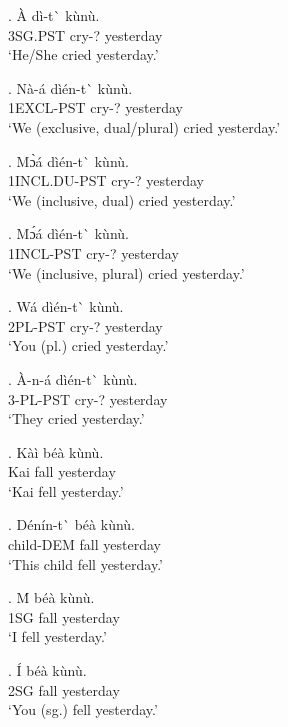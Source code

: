 \documentclass{assets/fieldnotes}
\begin{document}
{\exg. \`{A} d\`{i}-t\`{} k\`{u}n\`{u}. \\
3SG.PST cry-? yesterday \\
`He/She cried yesterday.'

\exg. N\`{a}-\'{a} d\`{i}\'{e}n-t\`{} k\`{u}n\`{u}. \\
1EXCL-PST cry-? yesterday \\
`We (exclusive, dual/plural) cried yesterday.'

\exg. M\`{ɔ}\'{a} d\`{i}\'{e}n-t\`{} k\`{u}n\`{u}. \\
1INCL.DU-PST cry-? yesterday \\
`We (inclusive, dual) cried yesterday.'

\exg. M\'{ɔ}\'{a} d\`{i}\'{e}n-t\`{} k\`{u}n\`{u}. \\
1INCL-PST cry-? yesterday \\
`We (inclusive, plural) cried yesterday.'

\exg. W\'{a} d\`{i}\'{e}n-t\`{} k\`{u}n\`{u}. \\
2PL-PST cry-? yesterday \\
`You (pl.) cried yesterday.' 

\exg. \`{A}-n-\'{a} d\`{i}\'{e}n-t\`{} k\`{u}n\`{u}. \\
3-PL-PST cry-? yesterday \\
`They cried yesterday.'


\exg. K\`{a}\`{i} b\'{e}\`{a} k\`{u}n\`{u}. \\
Kai fall yesterday \\
`Kai fell yesterday.'

\exg. D\'{e}n\'{i}n-t\`{} b\'{e}\`{a} k\`{u}n\`{u}. \\
child-DEM fall yesterday \\
`This child fell yesterday.'

\exg. \'{M} b\'{e}\`{a} k\`{u}n\`{u}. \\
1SG fall yesterday \\
`I fell yesterday.' 

\exg. \'{I} b\'{e}\`{a} k\`{u}n\`{u}. \\
2SG fall yesterday \\
`You (sg.) fell yesterday.' 

}
\end{document}
